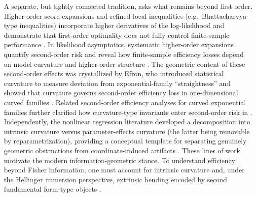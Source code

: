 \documentclass[11pt,letterpaper]{amsart}
\numberwithin{equation}{section}
\theoremstyle{plain}
\theoremstyle{definition}
\theoremstyle{remark}
\begin{document}
A separate, but tightly connected tradition, asks what remains beyond first order. Higher-order score expansions and refined local inequalities (e.g.\ Bhattacharyya-type inequalities) incorporate higher derivatives of the log-likelihood and demonstrate that first-order optimality does not fully control finite-sample performance \cite{Bhattacharyya1946,LehmannCasella1998}. In likelihood asymptotics, systematic higher-order expansions quantify second-order risk and reveal how finite-sample efficiency losses depend on model curvature and higher-order structure \cite{BarndorffNielsenCox1994,KassVos2011}. The geometric content of these second-order effects was crystallized by Efron, who introduced statistical curvature to measure deviation from exponential-family ``straightness'' and showed that curvature governs second-order efficiency loss in one-dimensional curved families \cite{Efron1975}. Related second-order efficiency analyses for curved exponential families further clarified how curvature-type invariants enter second-order risk in \cite{Eguchi1983,KassVos2011}. Independently, the nonlinear regression literature developed a decomposition into intrinsic curvature versus parameter-effects curvature (the latter being removable by reparametrization), providing a conceptual template for separating genuinely geometric obstructions from coordinate-induced artifacts \cite{BatesWatts1980}. These lines of work motivate the modern information-geometric stance. To understand efficiency beyond Fisher information, one must account for intrinsic curvature and, under the Hellinger immersion perspective, extrinsic bending encoded by second fundamental form-type objects \cite{AmariNagaoka2000,AyJost2017b,Lauritzen1987}.
\end{document}
